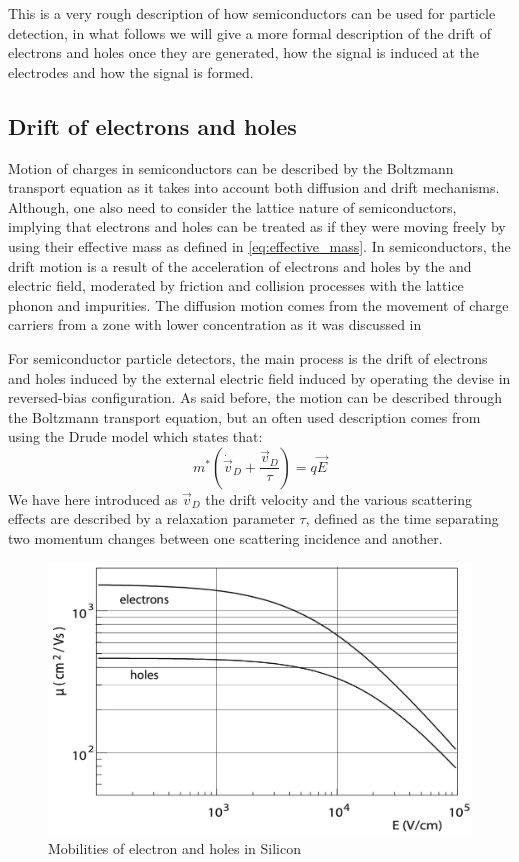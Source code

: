 	This is a very rough description of how semiconductors can be used for particle detection, in what follows we will give a more formal description of the drift of electrons and holes once they are generated, how the signal is induced at the electrodes and how the signal is formed.   

		\subsection{Drift of electrons and holes}\label{subsec:2.2.1}
		
		Motion of charges in semiconductors can be described by the Boltzmann transport equation as it takes into account both diffusion and drift mechanisms. Although, one also need to consider the lattice nature of semiconductors, implying that electrons and holes can be treated as if they were moving freely by using their effective mass as defined in \eqref{eq:effective_mass}. In semiconductors, the drift motion is a result of the acceleration of electrons and holes by the and electric field, moderated by friction and collision processes with the lattice phonon and impurities. The diffusion motion comes from the movement of charge carriers from a zone with lower concentration as it was discussed in 

		For semiconductor particle detectors, the main process is the drift of electrons and holes induced by the external electric field induced by operating the devise in reversed-bias configuration. As said before, the motion can be described through the Boltzmann transport equation, but an often used description comes from using the Drude model \cite{Drude} which states that: 
		\begin{equation}
			m^* {\left( \dot{\vec{v}}_D + \frac{\vec{v}_D}{\tau}\right)} = q \vec{E}
		\end{equation} 
		We have here introduced as $\vec{v}_D$ the drift velocity and the various scattering effects are described by a relaxation parameter $\tau$, defined as the time separating two momentum changes between one scattering incidence and another. 
		
		\begin{figure}[h]
			\centering
			\includegraphics[width=0.58\linewidth]{files/electron-hole_mobility}
			\caption{ Mobilities of electron and holes in Silicon}
			\label{ }
		\end{figure}


